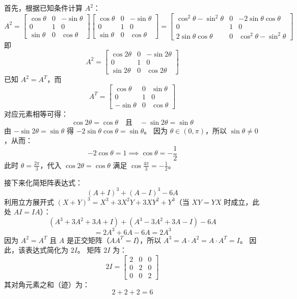 \begin{questions}
\begin{solution}
首先，根据已知条件计算 $A^2$：
\[
A^2 = \begin{bmatrix} \cos \theta & 0 & -\sin \theta \\ 0 & 1 & 0 \\ \sin \theta & 0 & \cos \theta \end{bmatrix} \begin{bmatrix} \cos \theta & 0 & -\sin \theta \\ 0 & 1 & 0 \\ \sin \theta & 0 & \cos \theta \end{bmatrix} = \begin{bmatrix} \cos^2 \theta - \sin^2 \theta & 0 & -2\sin \theta \cos \theta \\ 0 & 1 & 0 \\ 2\sin \theta \cos \theta & 0 & \cos^2 \theta - \sin^2 \theta \end{bmatrix}
\]
即
\[
A^2 = \begin{bmatrix} \cos 2\theta & 0 & -\sin 2\theta \\ 0 & 1 & 0 \\ \sin 2\theta & 0 & \cos 2\theta \end{bmatrix}
\]
已知 $A^2 = A^T$，而
\[
A^T = \begin{bmatrix} \cos \theta & 0 & \sin \theta \\ 0 & 1 & 0 \\ -\sin \theta & 0 & \cos \theta \end{bmatrix}
\]
对应元素相等可得：
\[
\cos 2\theta = \cos \theta \quad \text{且} \quad -\sin 2\theta = \sin \theta
\]
由 $-\sin 2\theta = \sin \theta$ 得 $-2\sin \theta \cos \theta = \sin \theta$。
因为 $\theta \in (0, \pi)$，所以 $\sin \theta \neq 0$，从而：
\[
-2\cos \theta = 1 \implies \cos \theta = -\frac{1}{2}
\]
此时 $\theta = \frac{2\pi}{3}$，代入 $\cos 2\theta = \cos \theta$ 满足 $\cos \frac{4\pi}{3} = -\frac{1}{2}$。

接下来化简矩阵表达式：
\[
(A + I)^3 + (A - I)^3 - 6A
\]
利用立方展开式 $(X+Y)^3 = X^3 + 3X^2Y + 3XY^2 + Y^3$（当 $XY=YX$ 时成立，此处 $AI=IA$）：
\[
(A^3 + 3A^2 + 3A + I) + (A^3 - 3A^2 + 3A - I) - 6A
\]
\[
= 2A^3 + 6A - 6A = 2A^3
\]
因为 $A^2 = A^T$ 且 $A$ 是正交矩阵（$AA^T = I$），所以 $A^3 = A \cdot A^2 = A \cdot A^T = I$。
因此，该表达式简化为 $2I$。
矩阵 $2I$ 为：
\[
2I = \begin{bmatrix} 2 & 0 & 0 \\ 0 & 2 & 0 \\ 0 & 0 & 2 \end{bmatrix}
\]
其对角元素之和（迹）为：
\[
2 + 2 + 2 = 6
\]
\end{solution}


\end{questions}
